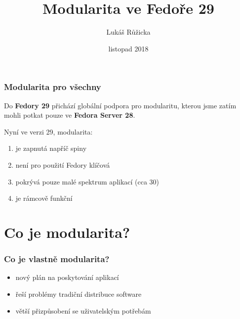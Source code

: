 \documentclass[12pt]{beamer}
\begin{document}
	\author{Lukáš Růžicka}
	\title{Modularita ve Fedoře 29}
	\subtitle{}
	\date{listopad 2018}
	\subject{Fedora 29}
	\begin{frame}[plain]
	\maketitle
\end{frame}

\begin{frame}
\frametitle{Modularita pro všechny}
Do \textbf{Fedory 29} přichází globální podpora pro modularitu, kterou jsme zatím mohli potkat pouze ve \textbf{Fedora Server 28}. 

Nyní ve verzi 29, modularita:

\vspace{5pt}

\begin{enumerate}
	\item je zapnutá napříč spiny
	\item není pro použití Fedory klíčová
	\item pokrývá pouze malé spektrum aplikací (cca 30)
	\item je rámcově funkční
\end{enumerate}	
\end{frame}


\section{Co je modularita?}

\begin{frame}
\frametitle{Co je vlastně modularita?}


\begin{itemize}
	\item nový plán na poskytování aplikací
	\item řeší problémy tradiční distribuce software
	\item větší přizpůsobení se uživatelským potřebám
\end{itemize}

\end{frame}
\end{document}
